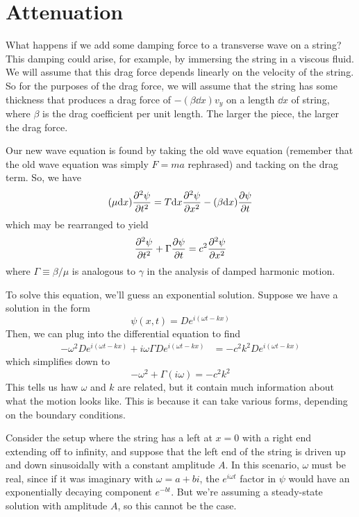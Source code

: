 \section{Attenuation}
What happens if we add some damping force to a transverse wave on a string? This damping could arise, for example, by immersing the string in a viscous fluid. We will assume that this drag force depends linearly on the velocity of the string. So for the purposes of the drag force, we will assume that the string has some thickness that produces a drag force of $-(\beta \dd x)v_y$ on a length $\dd x$ of string, where $\beta$ is the drag coefficient per unit length. The larger the piece, the larger the drag force.

Our new wave equation is found by taking the old wave equation (remember that the old wave equation was simply $F=ma$ rephrased) and tacking on the drag term. So, we have
\[ (\mu \dd x)\pdv[2]{\psi}{t} = T\dd x \pdv[2]{\psi}{x} - (\beta \dd x)\pdv{\psi}{t} \]
which may be rearranged to yield
\[ \pdv[2]{\psi}{t} + \Gamma \pdv{\psi}{t} = c^2\pdv[2]{\psi}{x} \]
where $\Gamma \equiv \beta / \mu$ is analogous to $\gamma$ in the analysis of damped harmonic motion.

To solve this equation, we'll guess an exponential solution. Suppose we have a solution in the form
\[ \psi(x,t) = De^{i(\omega t-kx)}\]
Then, we can plug into the differential equation to find
\begin{align*}
    -\omega^2 De^{i(\omega t-kx)} + i\omega \Gamma De^{i(\omega t-kx)} &= -c^2k^2De^{i(\omega t-kx)}
\end{align*}
which simplifies down to
\[ -\omega^2 + \Gamma(i\omega) = -c^2k^2 \]
This tells us haw $\omega$ and $k$ are related, but it contain much information about what the motion looks like. This is because it can take various forms, depending on the boundary conditions.

Consider the setup where the string has a left at $x=0$ with a right end extending off to infinity, and suppose that the left end of the string is driven up and down sinusoidally with a constant amplitude $A$. In this scenario, $\omega$ must be real, since if it was imaginary with $\omega = a+bi$, the $e^{i\omega t}$ factor in $\psi$ would have an exponentially decaying component $e^{-bt}$. But we're assuming a steady-state solution with amplitude $A$, so this cannot be the case.


